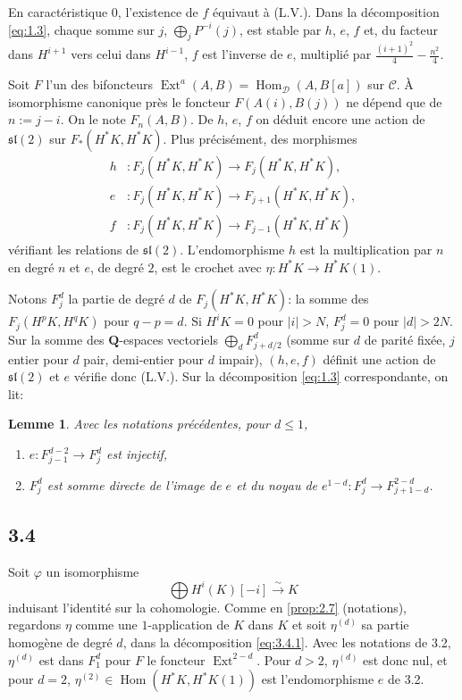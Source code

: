 \documentclass[11pt,a4paper]{article}
\theoremstyle{plain}
\newtheorem{lemma}[theorem]{Lemme}
\theoremstyle{definition}
\DeclareMathOperator{\Ext}{Ext}
\DeclareMathOperator{\Hom}{Hom}
\newcommand{\cD}{\mathscr{D}}
\newcommand{\cC}{\mathscr{C}}
\newcommand{\bQ}{\mathbf{Q}}
\begin{document}
En caract\'eristique $0$, l'existence de $f$ \'equivaut \`a (L.V.). Dans la d\'ecomposition \eqref{eq:1.3}, chaque somme sur $j$, $\bigoplus_j P^{-i}(j)$, est stable par $h$, $e$, $f$ et, du facteur dans $H^{i+1}$ vers celui dans $H^{i-1}$, $f$ est l'inverse de $e$, multipli\'e par $\frac{(i+1)^2}{4} - \frac{n^2}{4}$.

Soit $F$ l'un des bifoncteurs $\Ext^a(A,B) = \Hom_{\cD}(A,B[a])$ sur $\cC$. \`A isomorphisme canonique pr\`es le foncteur $F(A(i), B(j))$ ne d\'epend que de $n := j-i$. On le note $F_n(A,B)$. De $h$, $e$, $f$ on d\'eduit encore une action de $\mathfrak{sl}(2)$ sur $F_*(H^*K, H^*K)$. Plus pr\'ecis\'ement, des morphismes
\begin{align*}
h &\colon F_j(H^*K, H^*K) \to F_j(H^*K, H^*K), \\
e &\colon F_j(H^*K, H^*K) \to F_{j+1}(H^*K, H^*K), \\
f &\colon F_j(H^*K, H^*K) \to F_{j-1}(H^*K, H^*K)
\end{align*}
v\'erifiant les relations de $\mathfrak{sl}(2)$. L'endomorphisme $h$ est la multiplication par $n$ en degr\'e $n$ et $e$, de degr\'e $2$, est le crochet avec $\eta \colon H^*K \to H^*K(1)$.

Notons $F_j^d$ la partie de degr\'e $d$ de $F_j(H^*K, H^*K)$: la somme des $F_j(H^p K, H^q K)$ pour $q-p = d$. Si $H^i K = 0$ pour $|i| > N$, $F_j^d = 0$ pour $|d| > 2N$. Sur la somme des $\bQ$-espaces vectoriels $\bigoplus_d F_{j+d/2}^d$ (somme sur $d$ de parit\'e fix\'ee, $j$ entier pour $d$ pair, demi-entier pour $d$ impair), $(h,e,f)$ d\'efinit une action de $\mathfrak{sl}(2)$ et $e$ v\'erifie donc (L.V.). Sur la d\'ecomposition \eqref{eq:1.3} correspondante, on lit:

\begin{lemma}\label{lem:3.3}
Avec les notations pr\'ec\'edentes, pour $d \leqslant 1$,
\begin{enumerate}[label=\textup{(\roman*)}]
\item $e \colon F_{j-1}^{d-2} \to F_j^d$ est injectif,
\item $F_j^d$ est somme directe de l'image de $e$ et du noyau de $e^{1-d} \colon F_j^d \to F_{j+1-d}^{2-d}$.
\end{enumerate}
\end{lemma}

\subsection*{3.4}
Soit $\varphi$ un isomorphisme
\begin{equation}\label{eq:3.4.1}
\bigoplus H^i(K)[-i] \xrightarrow{\sim} K
\end{equation}
induisant l'identit\'e sur la cohomologie. Comme en \ref{prop:2.7} (notations), regardons $\eta$ comme une $1$-application de $K$ dans $K$ et soit $\eta^{(d)}$ sa partie homog\`ene de degr\'e $d$, dans la d\'ecomposition \eqref{eq:3.4.1}. Avec les notations de 3.2, $\eta^{(d)}$ est dans $F_1^d$ pour $F$ le foncteur $\Ext^{2-d}$. Pour $d > 2$, $\eta^{(d)}$ est donc nul, et pour $d=2$, $\eta^{(2)} \in \Hom(H^*K, H^*K(1))$ est l'endomorphisme $e$ de 3.2.
\end{document}
